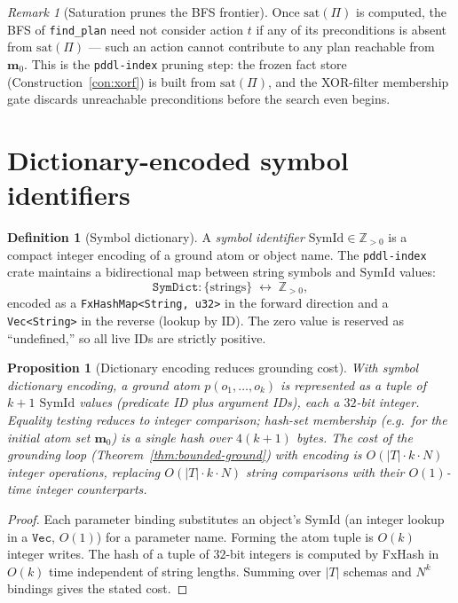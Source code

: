 \documentclass[11pt,oneside]{book}
\theoremstyle{definition}
\newtheorem{definition}{Definition}[chapter]
\theoremstyle{plain}
\newtheorem{proposition}[theorem]{Proposition}
\theoremstyle{remark}
\newtheorem*{remark}{Remark}
\newcommand{\code}[1]{\texttt{#1}}
\begin{document}
\begin{remark}[Saturation prunes the BFS frontier]
Once $\mathrm{sat}(\Pi)$ is computed, the BFS of \code{find\_plan} need not consider
action $t$ if any of its preconditions is absent from $\mathrm{sat}(\Pi)$ --- such an
action cannot contribute to any plan reachable from $\bm m_0$. This is the
\code{pddl-index} pruning step: the frozen fact store (Construction~\ref{con:xorf}) is
built from $\mathrm{sat}(\Pi)$, and the XOR-filter membership gate discards unreachable
preconditions before the search even begins.
\end{remark}

\section{Dictionary-encoded symbol identifiers}

\begin{definition}[Symbol dictionary]\label{def:symdict}
A \emph{symbol identifier} $\mathrm{SymId}\in\mathbb{Z}_{>0}$ is a compact integer
encoding of a ground atom or object name. The \code{pddl-index} crate maintains a
bidirectional map between string symbols and $\mathrm{SymId}$ values:
\[
\code{SymDict}: \{\text{strings}\} \;\leftrightarrow\; \mathbb{Z}_{>0},
\]
encoded as a \code{FxHashMap<String, u32>} in the forward direction and a \code{Vec<String>}
in the reverse (lookup by ID). The zero value is reserved as ``undefined,'' so all live
IDs are strictly positive.
\end{definition}

\begin{proposition}[Dictionary encoding reduces grounding cost]
\label{prop:dictcost}
With symbol dictionary encoding, a ground atom $p(o_1,\dots,o_k)$ is represented as a
tuple of $k+1$ $\mathrm{SymId}$ values (predicate ID plus argument IDs), each a
$32$-bit integer. Equality testing reduces to integer comparison; hash-set membership
(e.g.\ for the initial atom set $\bm m_0$) is a single hash over $4(k+1)$ bytes. The
cost of the grounding loop (Theorem~\ref{thm:bounded-ground}) with encoding is
$O(|T|\cdot k \cdot N)$ integer operations, replacing $O(|T|\cdot k \cdot N)$ string
comparisons with their $O(1)$-time integer counterparts.
\end{proposition}

\begin{proof}
Each parameter binding substitutes an object's $\mathrm{SymId}$ (an integer lookup in a
$\code{Vec}$, $O(1)$) for a parameter name. Forming the atom tuple is $O(k)$ integer
writes. The hash of a tuple of $32$-bit integers is computed by FxHash in $O(k)$ time
independent of string lengths. Summing over $|T|$ schemas and $N^k$ bindings gives the
stated cost.
\end{proof}
\end{document}

